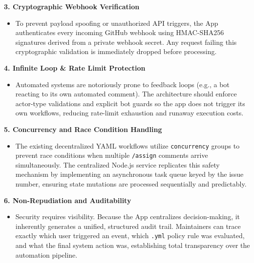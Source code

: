 \documentclass[11pt]{article}
\begin{document}
\vspace{5pt}
\noindent
\textbf{3. Cryptographic Webhook Verification}
\begin{itemize}[leftmargin=18pt,itemsep=2pt,topsep=0pt]
\item To prevent payload spoofing or unauthorized API triggers, the App authenticates every incoming GitHub webhook using HMAC-SHA256 signatures derived from a private webhook secret. Any request failing this cryptographic validation is immediately dropped before processing.
\end{itemize}

\vspace{5pt}
\noindent
\textbf{4. Infinite Loop \& Rate Limit Protection}
\begin{itemize}[leftmargin=18pt,itemsep=2pt,topsep=0pt]
\item Automated systems are notoriously prone to feedback loops (e.g., a bot reacting to its own automated comment). The architecture should enforce actor-type validations and explicit bot guards so the app does not trigger its own workflows, reducing rate-limit exhaustion and runaway execution costs.
\end{itemize}

\vspace{5pt}
\noindent
\textbf{5. Concurrency and Race Condition Handling}
\begin{itemize}[leftmargin=18pt,itemsep=2pt,topsep=0pt]
\item The existing decentralized YAML workflows utilize \texttt{concurrency} groups to prevent race conditions when multiple \texttt{/assign} comments arrive simultaneously. The centralized Node.js service replicates this safety mechanism by implementing an asynchronous task queue keyed by the issue number, ensuring state mutations are processed sequentially and predictably.
\end{itemize}

\vspace{5pt}
\noindent
\textbf{6. Non-Repudiation and Auditability}
\begin{itemize}[leftmargin=18pt,itemsep=2pt,topsep=0pt]
\item Security requires visibility. Because the App centralizes decision-making, it inherently generates a unified, structured audit trail. Maintainers can trace exactly which user triggered an event, which \texttt{.yml} policy rule was evaluated, and what the final system action was, establishing total transparency over the automation pipeline.
\end{itemize}
\end{document}
